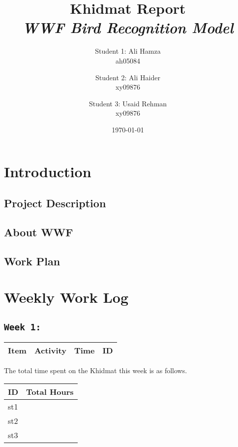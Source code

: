 \documentclass{article}
\title {\Huge Khidmat Report\\
\textit{WWF Bird Recognition Model}}
\author{
  Student 1: Ali Hamza\\ ah05084
  \and
  Student 2: Ali Haider\\ xy09876
  \and
  Student 3: Usaid Rehman\\ xy09876
}
\date{\today}
\begin{document}
\maketitle
\newpage
\tableofcontents
\newpage
\section{Introduction}
\subsection{Project Description}

\subsection{About WWF}
\subsection{Work Plan}
\newpage %

\section{Weekly Work Log}
\subsection{\texttt{Week 1: }}
\begin{center}
\begin{tabular}{|l|l|l|l|}
  \hline
  \textbf{Item} 	& \textbf{Activity} & \textbf{Time} & \textbf{ID} \\\hline
  
\end{tabular}
    
\end{center}
The total time spent on the Khidmat this week is as follows.    
\begin{center}
    
\begin{tabular}{|l|l|}
  \hline
  \textbf{ID} & \textbf{Total Hours}\\\hline
  st1 & \\\hline
  st2 & \\\hline
  st3 & \\\hline
\end{tabular}
\end{center}
\newpage
\end{document}
